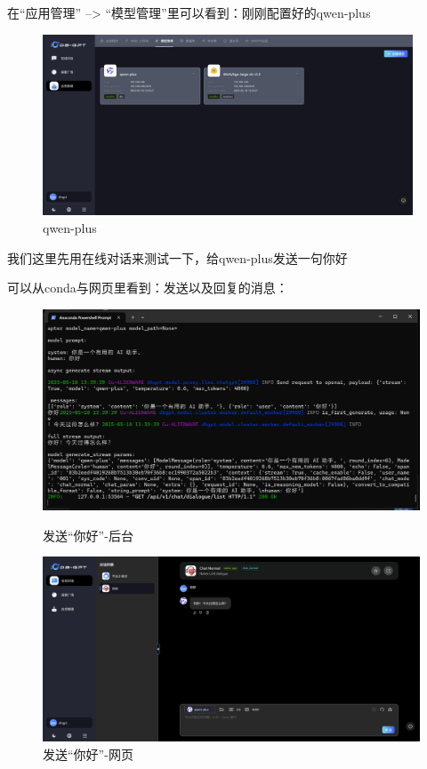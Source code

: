 \documentclass{article}
\begin{document}
	在“应用管理” –> “模型管理”里可以看到：刚刚配置好的qwen-plus
	
	\begin{figure}[H]
		\centering
		\includegraphics[width=11cm]{./images/18.qwen-plus.png}
		\caption{qwen-plus}
	\end{figure}
	
	我们这里先用在线对话来测试一下，给qwen-plus发送一句你好
	
	可以从conda与网页里看到：发送以及回复的消息：
	
	\begin{figure}[H]
		\centering
		\begin{minipage}[b]{0.45\textwidth}
			\includegraphics[width=\textwidth]{./images/19.发送“你好”-后台.png}
			\caption{发送“你好”-后台}
		\end{minipage}
		\hfill
		\begin{minipage}[b]{0.45\textwidth}
			\includegraphics[width=\textwidth]{./images/20.发送“你好”-网页.png}
			\caption{发送“你好”-网页}
		\end{minipage}
	\end{figure}
	
\end{document}
